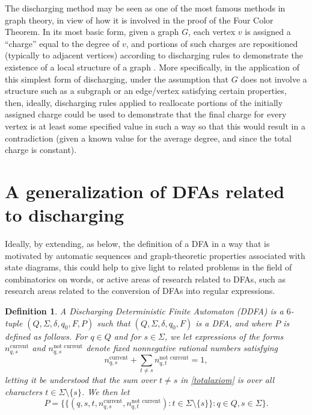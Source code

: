 \documentclass[12pt]{article}
\newtheorem{definition}{Definition}
\begin{document}
 The discharging method may be seen as one of the most famous methods in graph theory, in view of how it is involved in the proof of 
 the Four Color Theorem. In its most basic form, given a graph $G$, each vertex $v$ is assigned a ``charge'' equal to the degree of $v$, 
 and portions of such charges are repositioned (typically to adjacent vertices) according to discharging rules to demonstrate the 
 existence of a local structure of a graph \cite{CranstonWest2017}. More specifically, in the application of this simplest form of 
 discharging, under the assumption that $G$ does not involve a structure such as a subgraph or an edge/vertex satisfying certain 
 properties, then, ideally, discharging rules applied to reallocate portions of the initially assigned charge could be used to demonstrate 
 that the final charge for every vertex is at least some specified value in such a way so that this would result in a contradiction (given a 
 known value for the average degree, and since the total charge is constant). 

\section{A generalization of DFAs related to discharging}\label{sectiongeneralizeDFA}
 Ideally, by extending, as below, the definition of a DFA in a way that is motivated by automatic sequences and graph-theoretic 
 properties associated with state diagrams, this could help to give light to related problems in the field of combinatorics on words, or 
 active areas of research related to DFAs, such as research areas related to the conversion of DFAs into regular expressions. 
 

\begin{definition}\label{definitionDDFA}
 A \emph{Discharging Deterministic Finite Automaton} (DDFA) is a $6$-tuple 
 $(Q, \Sigma, \delta, q_0, F, P)$ 
 such that $(Q, \Sigma, \delta, q_0, F)$ is a DFA, and where $P$ is defined as follows. 
 For $q \in Q$ and for $s \in \Sigma$, 
 we let expressions of the forms 
 $n^{\text{current}}_{q, s}$ and 
 $n_{q, s}^{\text{not current}}$ denote fixed nonnegative rational numbers satisfying 
\begin{equation}\label{totalaxiom}
 n^{\text{current}}_{q, s} + 
 \sum_{t \neq s} n_{q, t}^{\text{not current}} = 1, 
\end{equation}
 letting it be understood that the sum over $t \neq s$ in \eqref{totalaxiom}
 is over all characters $t \in \Sigma \setminus \{ s \}$. 
 We then let 
 $$ P = \{ \{ (q, s, t, 
 n^{\text{current}}_{q, s}, n^{\text{not current}}_{q, t} 
 ) : t \in \Sigma \setminus \{ s \} \} : q \in Q, s \in \Sigma \}. $$ 
\end{definition}
\end{document}
